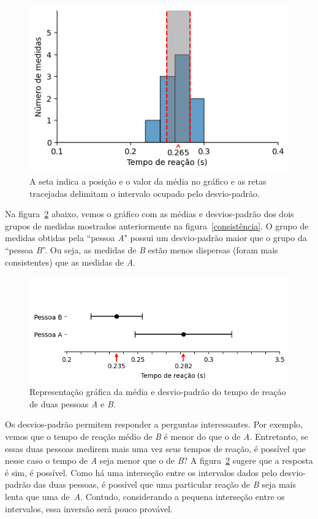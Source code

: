 \documentclass[12pt, a4paper]{article}
\begin{document}
\begin{figure}[H]
    \centering
    \includegraphics[width=0.92\linewidth]{histograma principal.png}
    \caption{A seta indica a posição e o valor da média no gráfico e as retas tracejadas delimitam o intervalo ocupado pelo desvio-padrão.}
    \label{histograma e dp}
\end{figure}


Na figura~\ref{dp alpha e beta} abaixo, vemos o gráfico com as médias e desvios-padrão dos dois grupos de medidas mostrados anteriormente na figura~\ref{consistência}. O grupo de medidas obtidas pela ``pessoa \textit{A}"  possui um desvio-padrão maior que o grupo da ``pessoa \textit{B}''. Ou seja, as medidas de \textit{B} estão menos dispersas (foram mais consistentes) que as medidas de \textit{A}.

\begin{figure}[H]
    \centering
    \includegraphics[width=0.95\linewidth]{pessoas alpha e beta.png}
    \caption{Representação gráfica da média e desvio-padrão do tempo de reação de duas pessoas \textit{A} e \textit{B}.}
    \label{dp alpha e beta}
\end{figure}

Os desvios-padrão permitem responder a perguntas interessantes. Por exemplo, vemos que o tempo de reação médio de \textit{B} é menor do que o de \textit{A}. Entretanto, se essas duas pessoas medirem mais uma vez seus tempos de reação, é possível que nesse caso o tempo de \textit{A} seja menor que o de \textit{B}? A figura~\ref{dp alpha e beta} sugere que a resposta é sim, é possível. Como há uma interseção entre os intervalos dados pelo desvio-padrão das duas pessoas, é possível que uma particular reação de \textit{B} seja mais lenta que uma de~\textit{A}. Contudo, considerando a pequena interseção entre os intervalos, essa inversão será pouco provável.
\end{document}

